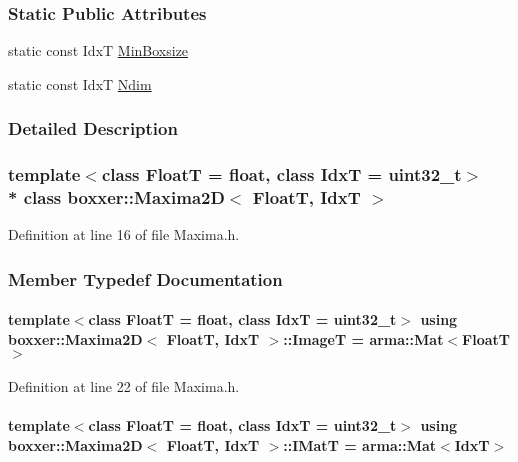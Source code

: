 \subsubsection*{Static Public Attributes}
\begin{DoxyCompactItemize}
\item 
static const IdxT \hyperlink{classboxxer_1_1Maxima2D_ab72858470871c7d5a90ed33839d7f220}{Min\+Boxsize}
\item 
static const IdxT \hyperlink{classboxxer_1_1Maxima2D_a839c84a80b49cd0bfae1715a04a45ddb}{Ndim}
\end{DoxyCompactItemize}


\subsubsection{Detailed Description}
\subsubsection*{template$<$class FloatT = float, class IdxT = uint32\+\_\+t$>$\\*
class boxxer\+::\+Maxima2\+D$<$ Float\+T, Idx\+T $>$}



Definition at line 16 of file Maxima.\+h.



\subsubsection{Member Typedef Documentation}
\paragraph[{\texorpdfstring{ImageT}{ImageT}}]{\setlength{\rightskip}{0pt plus 5cm}template$<$class FloatT  = float, class IdxT  = uint32\+\_\+t$>$ using {\bf boxxer\+::\+Maxima2D}$<$ FloatT, IdxT $>$\+::{\bf ImageT} =  arma\+::\+Mat$<$FloatT$>$}\hypertarget{classboxxer_1_1Maxima2D_ac6ececb6be39bc2fb15904134da4dafb}{}\label{classboxxer_1_1Maxima2D_ac6ececb6be39bc2fb15904134da4dafb}


Definition at line 22 of file Maxima.\+h.

\paragraph[{\texorpdfstring{I\+MatT}{IMatT}}]{\setlength{\rightskip}{0pt plus 5cm}template$<$class FloatT  = float, class IdxT  = uint32\+\_\+t$>$ using {\bf boxxer\+::\+Maxima2D}$<$ FloatT, IdxT $>$\+::{\bf I\+MatT} =  arma\+::\+Mat$<$IdxT$>$}\hypertarget{classboxxer_1_1Maxima2D_a8b90b97357c1bdf671e833446e15903b}{}\label{classboxxer_1_1Maxima2D_a8b90b97357c1bdf671e833446e15903b}


